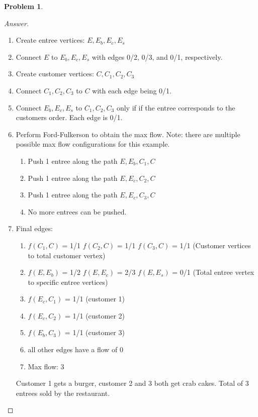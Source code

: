 \documentclass[11pt]{article}
\theoremstyle{definition}
\theoremstyle{definition}
\newtheorem{required}{Problem}
\theoremstyle{definition}
\begin{document}
\begin{required}
\begin{enumerate}[label=(\alph*)]
\begin{proof}[Answer]
\begin{enumerate}
    \item Create entree vertices: $E,E_b,E_c,E_s$
    \item Connect $E$ to $E_b,E_c,E_s$ with edges 0/2, 0/3, and 0/1, respectively. 
    \item Create customer vertices: $C,C_1,C_2,C_3$
    \item Connect $C_1,C_2,C_3$ to $C$ with each edge being 0/1.
    \item Connect $E_b,E_c,E_s$ to $C_1,C_2,C_3$ only if if the entree corresponds to the customers order. Each edge is 0/1.
    \item Perform Ford-Fulkerson to obtain the max flow. Note: there are multiple possible max flow configurations for this example. 
    \begin{enumerate}
        \item Push 1 entree along the path $E,E_b,C_1,C$
        \item Push 1 entree along the path $E,E_c,C_2,C$
        \item Push 1 entree along the path $E,E_c,C_3,C$
        \item No more entrees can be pushed. 
    \end{enumerate}
    \item Final edges:
        \begin{enumerate}
            \item $f(C_1,C)$ = 1/1 $f(C_2,C)$ = 1/1 $f(C_3,C)$ = 1/1 (Customer vertices to total customer vertex) 
            \item $f(E, E_b)$ = 1/2 $f(E,E_c)$ = 2/3 $f(E,E_s)$ = 0/1 (Total entree vertex to specific entree vertices)
            \item $f(E_c, C_1)$ = 1/1 (customer 1) 
            \item $f(E_c, C_2)$ = 1/1 (customer 2) 
            \item $f(E_b, C_3)$ = 1/1 (customer 3) 
            \item all other edges have a flow of 0 
            \item Max flow: 3
        \end{enumerate}
        Customer 1 gets a burger, customer 2 and 3 both get crab cakes. Total of 3 entrees sold by the restaurant. 
\end{enumerate}





\end{proof}

\end{enumerate}
\end{required}
\end{document}
